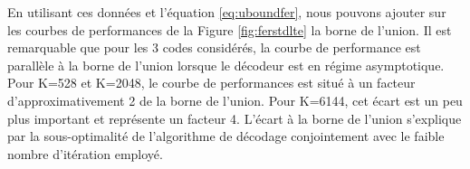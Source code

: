\begin{table}[]
\centering
\caption{Spectre de distance pour trois turbo codes du standard LTE}
\label{tab:spectre}
\end{table}
En utilisant ces données et l'équation \ref{eq:uboundfer}, nous pouvons ajouter sur les courbes de performances de la Figure 
\ref{fig:ferstdlte} la borne de l'union. Il est remarquable que pour les 3 codes considérés, la courbe de 
performance est parallèle à la borne de l'union lorsque le décodeur est en régime asymptotique. Pour K=528 et K=2048, 
le courbe de performances est situé à un facteur d'approximativement 2 de la borne de l'union. Pour K=6144, cet écart 
est un peu plus important et représente un facteur 4. L'écart à la borne de l'union s'explique par la sous-optimalité de 
l'algorithme de décodage conjointement avec le faible nombre d'itération employé.


